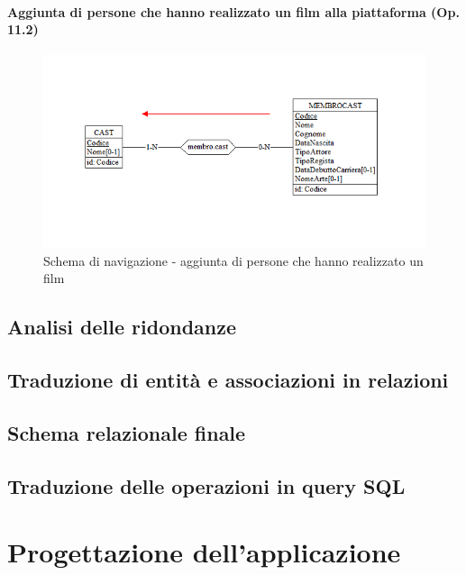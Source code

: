 \documentclass[a4paper,12pt]{report}
\begin{document}
	\subsubsection{Aggiunta di persone che hanno realizzato un film alla piattaforma (Op. 11.2)}
	\begin{figure}[H]
		\centering
		\includegraphics[width=450pt]{ER/navigazione/aggiuntacast.png}
		\caption{Schema di navigazione - aggiunta di persone che hanno realizzato un film}
	\end{figure}
	
	
	
	\section{Analisi delle ridondanze}
	\section{Traduzione di entità e associazioni in relazioni}
	\section{Schema relazionale finale}
	\section{Traduzione delle operazioni in query SQL}
	\chapter{Progettazione dell'applicazione}
\end{document}
